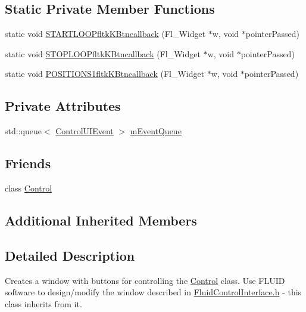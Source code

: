 \subsection*{Static Private Member Functions}
\begin{DoxyCompactItemize}
\item 
static void \hyperlink{class_mike_1_1_control_u_i_aaf2f6fc2cf93202867a797cf7bb6cc3e}{S\+T\+A\+R\+T\+L\+O\+O\+Pfltk\+K\+Btncallback} (Fl\+\_\+\+Widget $\ast$w, void $\ast$pointer\+Passed)
\item 
static void \hyperlink{class_mike_1_1_control_u_i_af3a7231a14cd112112e3e1c71e10baa1}{S\+T\+O\+P\+L\+O\+O\+Pfltk\+K\+Btncallback} (Fl\+\_\+\+Widget $\ast$w, void $\ast$pointer\+Passed)
\item 
static void \hyperlink{class_mike_1_1_control_u_i_ae37ce9f312e0f906a4847d6690927e27}{P\+O\+S\+I\+T\+I\+O\+N\+S1fltk\+K\+Btncallback} (Fl\+\_\+\+Widget $\ast$w, void $\ast$pointer\+Passed)
\end{DoxyCompactItemize}
\subsection*{Private Attributes}
\begin{DoxyCompactItemize}
\item 
std\+::queue$<$ \hyperlink{struct_mike_1_1_control_u_i_event}{Control\+U\+I\+Event} $>$ \hyperlink{class_mike_1_1_control_u_i_ae46585298dfd8ddb97a4d64168cc39e1}{m\+Event\+Queue}
\end{DoxyCompactItemize}
\subsection*{Friends}
\begin{DoxyCompactItemize}
\item 
class \hyperlink{class_mike_1_1_control_u_i_a9adf7c444a8611024541177662d4716a}{Control}
\end{DoxyCompactItemize}
\subsection*{Additional Inherited Members}


\subsection{Detailed Description}
Creates a window with buttons for controlling the \hyperlink{class_mike_1_1_control}{Control} class. Use F\+L\+U\+ID software to design/modify the window described in \hyperlink{_fluid_control_interface_8h}{Fluid\+Control\+Interface.\+h} -\/ this class inherits from it. 

